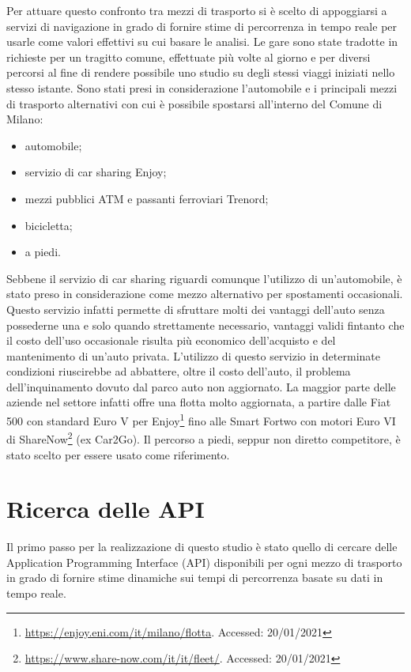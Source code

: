 Per attuare questo confronto tra mezzi di trasporto si è scelto di appoggiarsi a servizi di navigazione in grado di fornire stime di percorrenza in tempo reale per usarle come valori effettivi su cui basare le analisi. Le gare sono state tradotte in richieste per un tragitto comune, effettuate più volte al giorno e per diversi percorsi al fine di rendere possibile uno studio su degli stessi viaggi iniziati nello stesso istante. Sono stati presi in considerazione l'automobile e i principali mezzi di trasporto alternativi con cui è possibile spostarsi all'interno del Comune di Milano:
\begin{itemize}
	\item automobile;
	\item servizio di car sharing Enjoy;
	\item mezzi pubblici ATM e passanti ferroviari Trenord;
	\item bicicletta;
	\item a piedi.
\end{itemize}
Sebbene il servizio di car sharing riguardi comunque l'utilizzo di un'automobile, è stato preso in considerazione come mezzo alternativo per spostamenti occasionali. Questo servizio infatti permette di sfruttare molti dei vantaggi dell'auto senza possederne una e solo quando strettamente necessario, vantaggi validi fintanto che il costo dell'uso occasionale risulta più economico dell'acquisto e del mantenimento di un'auto privata. L'utilizzo di questo servizio in determinate condizioni riuscirebbe ad abbattere, oltre il costo dell'auto, il problema dell'inquinamento dovuto dal parco auto non aggiornato. La maggior parte delle aziende nel settore infatti offre una flotta molto aggiornata, a partire dalle Fiat 500 con standard Euro V per Enjoy\footnote{\url{https://enjoy.eni.com/it/milano/flotta}. Accessed: 20/01/2021} fino alle Smart Fortwo con motori Euro VI di ShareNow\footnote{\url{https://www.share-now.com/it/it/fleet/}. Accessed: 20/01/2021} (ex Car2Go). Il percorso a piedi, seppur non diretto competitore, è stato scelto per essere usato come riferimento.

\section{Ricerca delle API}

Il primo passo per la realizzazione di questo studio è stato quello di cercare delle Application Programming Interface (API) disponibili per ogni mezzo di trasporto in grado di fornire stime dinamiche sui tempi di percorrenza basate su dati in tempo reale.

